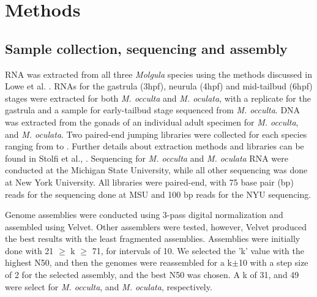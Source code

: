 \section{Methods}
\subsection{Sample collection, sequencing and assembly}
RNA was extracted from all three \textit{Molgula} species using the methods discussed in Lowe et al. \cite{lowe_evaluating_2014}. RNAs for the gastrula (3hpf), neurula (4hpf) and mid-tailbud (6hpf) stages were extracted for both \textit{M. occulta} and \textit{M. oculata}, with a replicate for the gastrula and a sample for early-tailbud stage sequenced from \textit{M. occulta}. %
DNA was extracted from the gonads of an individual adult specimen for %
\textit{M. occulta}, and \textit{M. oculata}. Two paired-end jumping libraries were collected for each species ranging from  to . Further details about extraction methods and libraries can be found in Stolfi et al., \cite{stolfi_divergent_2014}. Sequencing for \textit{M. occulta} and \textit{M. oculata} RNA were conducted at the Michigan State University, while all other sequencing was done at New York University. All libraries were paired-end, with 75 base pair (bp) reads for the sequencing done at MSU and 100 bp reads for the NYU sequencing. 

Genome assemblies were conducted using 3-pass digital normalization \cite{brown_reference-free_2012} and assembled using Velvet\cite{zerbino_velvet:_2008}. Other assemblers were tested, however, Velvet produced the best results with the least fragmented assemblies. Assemblies were initially done with 21 $\geq$ k $\geq$ 71, for intervals of 10. We selected the 'k' value with the highest N50, and then the genomes were reassembled for a k$\pm$10 with a step size of 2 for the selected assembly, and the best N50 was chosen. A k of 31, and 49 were select for \textit{M. occulta}, and \textit{M. oculata}, respectively. 

